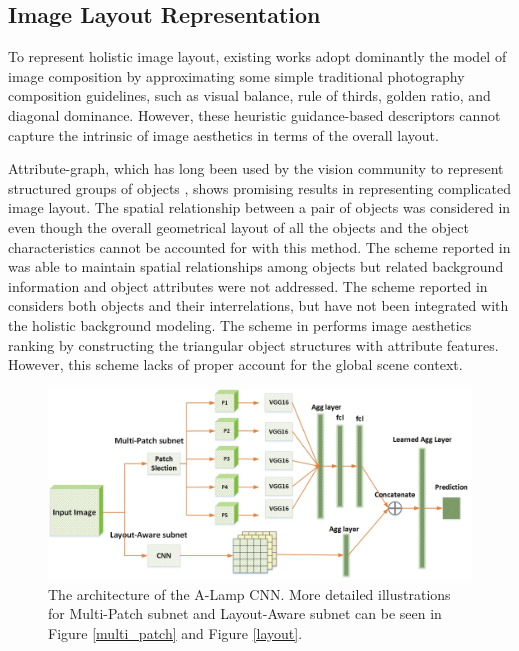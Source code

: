 \documentclass[10pt,twocolumn,letterpaper]{article}
\begin{document}
\subsection{Image Layout Representation}
To represent holistic image layout, existing works \cite{2010:optimizing_composition,2010:ICIP:composition,2012:ICIP:composition,ICML:2012:composition,Yao:2012:oscar,Ma:2014:ICIP:photography,Ma:2014:ACMMM:pose,Zhou:2015:ACMMM:vanishing_point} adopt dominantly the model of image composition by approximating some simple traditional photography composition guidelines, such as visual balance, rule of thirds, golden ratio, and diagonal dominance. However, these heuristic guidance-based descriptors cannot capture the intrinsic of image aesthetics in terms of the overall layout. 

Attribute-graph, which has long been used by the vision community to represent structured groups of objects \cite{Felzenszwalb:2004:graph_seg,Lu:2014:graph,CVPR:2014:multigraph,Shi:2000:PAMI:graph,TIP:2014:graphlet}, shows promising results in representing complicated image layout.   The spatial relationship between a pair of objects was considered in \cite{Lan:2012:ECCV:retrieval} even though the overall geometrical layout of all the objects and the object characteristics cannot be accounted for with this method. The scheme reported in \cite{Xu:2010:SIGAPH:concep_map} was able to maintain spatial relationships among objects but related background information and object attributes were not addressed. The scheme reported in  \cite{2013:PAMI:description} considers both objects and their interrelations, but have not been integrated with the holistic background modeling. The scheme in \cite{Cao:2014:ACMMM:layout} performs image aesthetics ranking by constructing the triangular object structures with attribute features. However, this scheme lacks of proper account for the global scene context.

\begin{figure}
	\centering
	\includegraphics[scale=0.23]{figures/whole_net.jpg}
	\caption{The architecture of the A-Lamp CNN. More detailed illustrations for Multi-Patch subnet and Layout-Aware subnet can be seen in Figure \ref{multi_patch} and Figure \ref{layout}.}
	\label{whole_net}
	\vspace{-3mm}
\end{figure}
\end{document}
